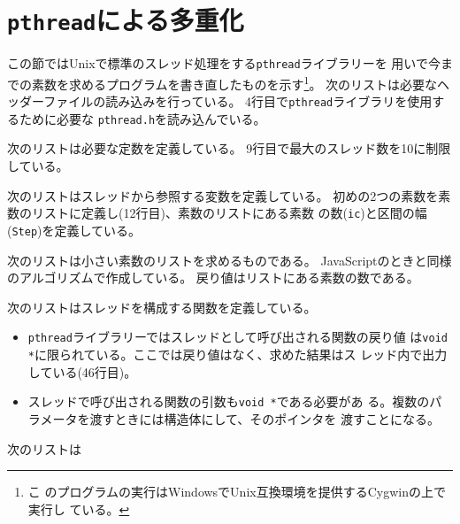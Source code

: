  \section{\texttt{pthread}による多重化}
 この節ではUnixで標準のスレッド処理をする\texttt{pthread}ライブラリーを
  用いで今までの素数を求めるプログラムを書き直したものを示す\footnote{こ
  のプログラムの実行はWindowsでUnix互換環境を提供するCygwinの上で実行し
  ている。}。
	次のリストは必要なヘッダーファイルの読み込みを行っている。
	4行目で\texttt{pthread}ライブラリを使用するために必要な
  \texttt{pthread.h}を読み込んでいる。

	次のリストは必要な定数を定義している。
	9行目で最大のスレッド数を10に制限している。

	次のリストはスレッドから参照する変数を定義している。
	初めの2つの素数を素数のリストに定義し(12行目)、素数のリストにある素数
  の数(\texttt{ic})と区間の幅(\texttt{Step})を定義している。

	次のリストは小さい素数のリストを求めるものである。
	JavaScriptのときと同様のアルゴリズムで作成している。
  戻り値はリストにある素数の数である。

	次のリストはスレッドを構成する関数を定義している。
	\begin{itemize}
	 \item 	\texttt{pthread}ライブラリーではスレッドとして呼び出される関数の戻り値
  は\texttt{void *}に限られている。ここでは戻り値はなく、求めた結果はス
  レッド内で出力している(46行目)。
	 \item スレッドで呼び出される関数の引数も\texttt{void *}である必要があ
				 る。複数のパラメータを渡すときには構造体にして、そのポインタを
				 渡すことになる。
	\end{itemize}

	次のリストは
